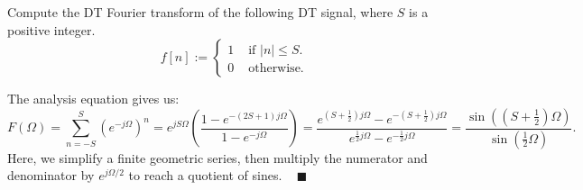 

\begin{problem}
    Compute the DT Fourier transform of the following DT signal, where $S$ is a positive integer.
    \[ f[n] := \begin{cases}
    1 & \text{ if } |n| \leq S. \\
    0 & \text{ otherwise.}
    \end{cases}\]
\end{problem}

\begin{solution}
    The analysis equation gives us:
    \[ F(\Omega) = \sum_{n = -S}^{S} \left(e^{-j\Omega}\right)^n
    = e^{jS\Omega} \left(\frac{1 - e^{- (2S + 1)j\Omega}}{1 - e^{-j \Omega}}\right)
    = \frac{
        e^{(S + \frac{1}{2})j \Omega} - e^{-(S + \frac{1}{2})j \Omega}
    }{
        e^{\frac{1}{2}j \Omega} - e^{-\frac{1}{2}j \Omega}
    } = \frac{\sin\left(\left(S + \frac{1}{2}\right)\Omega\right)}{\sin\left(\frac{1}{2}\Omega\right)}. \]
    Here, we simplify a finite geometric series,
    then multiply the numerator and denominator by $e^{j \Omega / 2}$
    to reach a quotient of sines. ~ $\blacksquare$
\end{solution}

